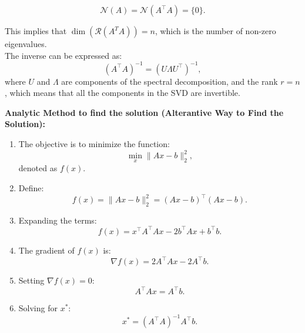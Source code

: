 \begin{derivation}
\begin{enumerate}
    \[
    \mathcal{N}(A) = \mathcal{N}(A^\top A) = \{0\}.
    \]

    This implies that $\dim (\mathcal{R} (A^T A)) = n$, which is the number of non-zero eigenvalues. \\

    The inverse can be expressed as:
    \[
    (A^\top A)^{-1} = (U \Lambda U^\top)^{-1},
    \]
    where $U$ and $\Lambda$ are components of the spectral decomposition, and the rank $r = n$, which means that all the components in the SVD are invertible.
    \end{enumerate} 
    \vspace{1em}
\end{derivation}

\begin{derivation}
    \textbf{Analytic Method to find the solution (Alterantive Way to Find the Solution):}
    \begin{enumerate}
        \item  The objective is to minimize the function:
        \[
        \min_x \|A x - b\|_2^2,
        \]
        denoted as $f(x)$. \\
        
        \item Define:
        \[
        f(x) = \|A x - b\|_2^2 = (A x - b)^\top (A x - b).
        \]
        
        \item Expanding the terms:
        \[
        f(x) = x^\top A^\top A x - 2 b^\top A x + b^\top b.
        \]
        
        \item The gradient of $f(x)$ is:
        \[
        \nabla f(x) = 2 A^\top A x - 2 A^\top b.
        \]
        
        \item Setting $\nabla f(x) = 0$:
        \[
        A^\top A x = A^\top b.
        \]
        
        \item Solving for $x^*$:
        \[
        x^* = (A^\top A)^{-1} A^\top b.
        \]
    \end{enumerate}
\end{derivation}

